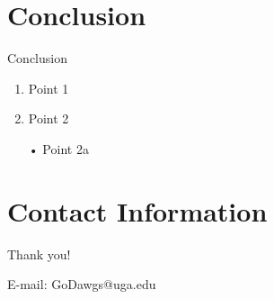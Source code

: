 \documentclass[10pt]{beamer}
\begin{document}
\section{Conclusion}
\begin{frame}{Conclusion}
\begin{enumerate}[(1)]
\item Point 1 
\vspace{3mm}
\vspace{3mm}
\item Point 2 
\vspace{3mm}
\vspace{3mm}

• Point 2a
\end{enumerate}
\end{frame}

\section{Contact Information}  
\begin{frame}

\textcolor{myNewColorC}{\huge{\centerline{Thank you!}}}
\vspace*{0.5cm}

\textcolor{myNewColorA}{\Large{\centerline{E-mail: GoDawgs@uga.edu}}}

\end{frame}
\end{document}
